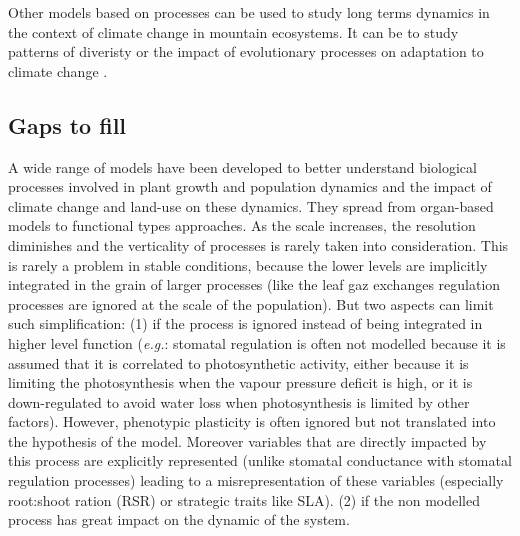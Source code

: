 Other models based on processes can be used to study long terms dynamics in the context of climate change in mountain ecosystems. It can be to study patterns of diveristy \parencite{boulangeat_fate-hd_2014} or the impact of evolutionary processes on adaptation to climate change \parencite{cotto_dynamic_2017}.






\subsection{Gaps to fill}

A wide range of models have been developed to better understand biological processes involved in plant growth and population dynamics and the impact of climate change and land-use on these dynamics. They spread from organ-based models to functional types approaches. As the scale increases, the resolution diminishes and the verticality of processes is rarely taken into consideration. This is rarely a problem in stable conditions, because the lower levels are implicitly integrated in the grain of larger processes (like the leaf gaz exchanges regulation processes are ignored at the scale of the population). But two aspects can limit such simplification: (1) if the process is ignored instead of being integrated in higher level function (\textit{e.g.}: stomatal regulation is often not modelled because it is assumed that it is correlated to photosynthetic activity, either because it is limiting the photosynthesis when the vapour pressure deficit is high, or it is down-regulated to avoid water loss when photosynthesis is limited by other factors). However, phenotypic plasticity is often ignored but not translated into the hypothesis of the model. Moreover variables that are directly impacted by this process are explicitly represented (unlike stomatal conductance with stomatal regulation processes) leading to a misrepresentation of these variables (especially root:shoot ration (RSR) or strategic traits like SLA). (2) if the non modelled process has great impact on the dynamic of the system. 


